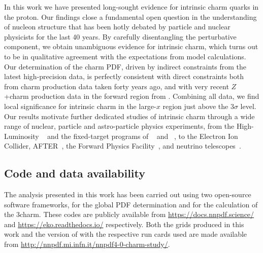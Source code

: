 
In this work we have presented long-sought evidence for intrinsic charm quarks
in the proton.
%
Our findings close a fundamental open question in the understanding of nucleon
structure that has been hotly debated by particle and nuclear physicists for
the last 40 years.
%
By carefully disentangling the perturbative component, we obtain unambiguous
evidence for intrinsic charm, which turns out to be in qualitative agreement
with the expectations from model calculations.
%
Our determination of the charm PDF, driven by indirect constraints from the 
latest high-precision \lhc data, is perfectly consistent with direct constraints
both from \emc charm production data taken forty years   ago, and with very
recent  $Z$+charm production data in the forward region from \lhcb.
%
Combining all data, we find local significance for intrinsic charm in the
large-$x$ region just above the $3\sigma$ level.
%
Our results motivate further dedicated studies of intrinsic charm through a
wide range of nuclear, particle and astro-particle physics experiments, from
the High-Luminosity \lhc~\cite{Azzi:2019yne} and the fixed-target programs of
\lhcb~\cite{LHCb:2018jry} and \alice~\cite{QCDWorkingGroup:2019dyv}, to the  
Electron Ion Collider, AFTER~\cite{Hadjidakis:2018ifr}, the Forward Physics
Facility~\cite{Anchordoqui:2021ghd}, and neutrino
telescopes~\cite{Halzen:2016thi}.

\subsection*{Code and data availability}

The analysis presented in this work has been carried out using two open-source
software frameworks,  for the global PDF determination and \eko for
the calculation of the 3\fns charm.
%
These codes are publicly available from \url{https://docs.nnpdf.science/} and
\url{https://eko.readthedocs.io/} respectively.
%
Both the \lhapdf grids produced in this work and the version of \eko with the
respective run cards used are made available from
\url{http://nnpdf.mi.infn.it/nnpdf4-0-charm-study/}.
